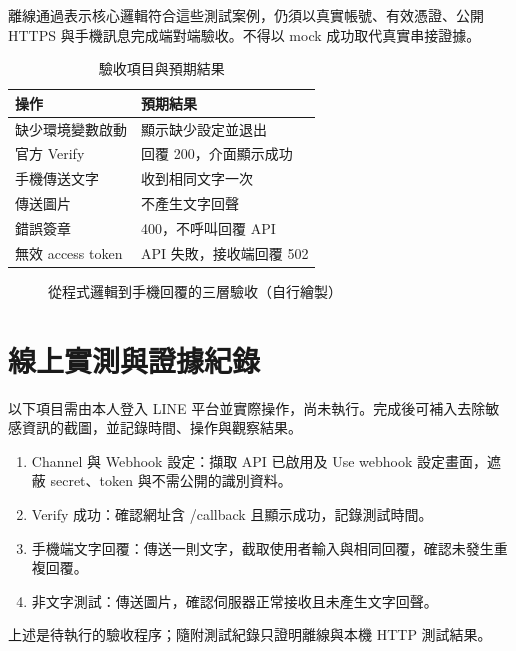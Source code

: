 \documentclass[12pt,a4paper]{report}
\begin{document}
離線通過表示核心邏輯符合這些測試案例，仍須以真實帳號、有效憑證、公開 HTTPS 與手機訊息完成端對端驗收。不得以 mock 成功取代真實串接證據。
\begin{table}[htbp]
\centering\caption{驗收項目與預期結果}\label{tab:acceptance}
\begin{tabular}{p{45mm}p{85mm}}\toprule
操作 & 預期結果\\\midrule
缺少環境變數啟動 & 顯示缺少設定並退出\\
官方 Verify & 回覆 200，介面顯示成功\\
手機傳送文字 & 收到相同文字一次\\
傳送圖片 & 不產生文字回聲\\
錯誤簽章 & 400，不呼叫回覆 API\\
無效 access token & API 失敗，接收端回覆 502\\\bottomrule
\end{tabular}
\end{table}

\begin{figure}[htbp]
\centering
{}
\caption{從程式邏輯到手機回覆的三層驗收（自行繪製）}\label{fig:testing}
\end{figure}

\section{線上實測與證據紀錄}
以下項目需由本人登入 LINE 平台並實際操作，尚未執行。完成後可補入去除敏感資訊的截圖，並記錄時間、操作與觀察結果。
\begin{enumerate}
\item Channel 與 Webhook 設定：擷取 API 已啟用及 Use webhook 設定畫面，遮蔽 secret、token 與不需公開的識別資料。
\item Verify 成功：確認網址含 /callback 且顯示成功，記錄測試時間。
\item 手機端文字回覆：傳送一則文字，截取使用者輸入與相同回覆，確認未發生重複回覆。
\item 非文字測試：傳送圖片，確認伺服器正常接收且未產生文字回聲。
\end{enumerate}
上述是待執行的驗收程序；隨附測試紀錄只證明離線與本機 HTTP 測試結果。
\end{document}
